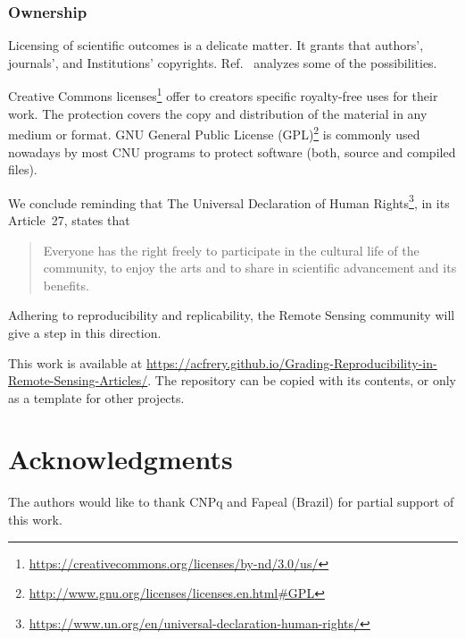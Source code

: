 \documentclass[journal,twoside]{IEEEtran}
\begin{document}
\subsubsection{Ownership}\label{Sec:Ownership}

Licensing of scientific outcomes is a delicate matter.
It grants that authors', journals', and Institutions' copyrights.
Ref.~\cite{TheLegalFrameworkforReproducibleScientificResearchLicensingandCopyright} analyzes some of the possibilities.  

Creative Commons licenses\footnote{\url{https://creativecommons.org/licenses/by-nd/3.0/us/}} offer to creators specific royalty-free uses for their work. 
The protection covers the copy and distribution of the material in any medium or format. 
GNU General Public License (GPL)\footnote{\url{http://www.gnu.org/licenses/licenses.en.html#GPL}} is commonly used nowadays by most CNU programs to protect software (both, source and compiled files). 

We conclude reminding that The Universal Declaration of Human Rights\footnote{\url{https://www.un.org/en/universal-declaration-human-rights/}}, in its Article~27, states that
\begin{quote}
	Everyone has the right freely to participate in the cultural life of the community, to enjoy the arts and to share in scientific advancement and its benefits.
\end{quote}
Adhering to reproducibility and replicability, the Remote Sensing community will give a step in this direction.

This work is available at \url{https://acfrery.github.io/Grading-Reproducibility-in-Remote-Sensing-Articles/}.
The repository can be copied with its contents, or only as a template for other projects.

\section*{Acknowledgments}

The authors would like to thank CNPq and Fapeal (Brazil) for partial support of this work.


	
\end{document}
